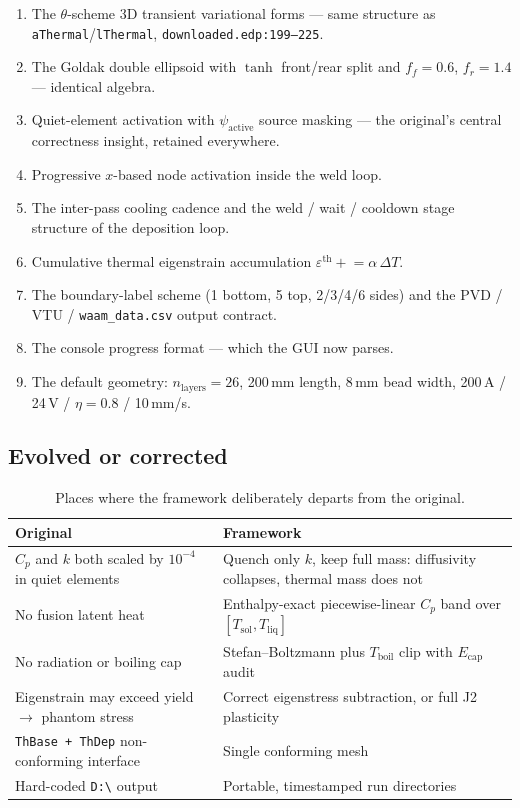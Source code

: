 \documentclass[10pt,a4paper]{article}
\newcommand{\code}[1]{\texttt{#1}}
\newcommand{\file}[1]{\texttt{\small #1}}
\begin{document}
\begin{enumerate}[leftmargin=1.8em,itemsep=0.2em]
    \item The $\theta$-scheme 3D transient variational forms --- same structure
    as \code{aThermal}/\code{lThermal}, \file{downloaded.edp:199--225}.
    \item The Goldak double ellipsoid with $\tanh$ front/rear split and
    $f_f = 0.6$, $f_r = 1.4$ --- identical algebra.
    \item Quiet-element activation with $\psi_{\text{active}}$ source masking
    --- the original's central correctness insight, retained everywhere.
    \item Progressive $x$-based node activation inside the weld loop.
    \item The inter-pass cooling cadence and the weld / wait / cooldown stage
    structure of the deposition loop.
    \item Cumulative thermal eigenstrain accumulation
    $\varepsilon^{\text{th}} \mathrel{+}= \alpha\,\Delta T$.
    \item The boundary-label scheme (1 bottom, 5 top, 2/3/4/6 sides) and the
    PVD / VTU / \code{waam\_data.csv} output contract.
    \item The console progress format --- which the GUI now parses.
    \item The default geometry: $n_{\text{layers}} = 26$, 200\,mm length,
    8\,mm bead width, 200\,A / 24\,V / $\eta = 0.8$ / 10\,mm/s.
\end{enumerate}

\subsection{Evolved or corrected}

\begin{table}[h!]
\centering
\caption{Places where the framework deliberately departs from the original.}
\label{tab:fixes}
\small
\begin{tabularx}{\linewidth}{@{}X X@{}}
\toprule
\textbf{Original} & \textbf{Framework} \\
\midrule
$C_p$ and $k$ both scaled by $10^{-4}$ in quiet elements & Quench only $k$,
keep full mass: diffusivity collapses, thermal mass does not \\
\addlinespace
No fusion latent heat & Enthalpy-exact piecewise-linear $C_p$ band over
$[T_{\text{sol}}, T_{\text{liq}}]$ \\
\addlinespace
No radiation or boiling cap & Stefan--Boltzmann plus $T_{\text{boil}}$ clip
with $E_{\text{cap}}$ audit \\
\addlinespace
Eigenstrain may exceed yield $\rightarrow$ phantom stress & Correct
eigenstress subtraction, or full J2 plasticity \\
\addlinespace
\code{ThBase + ThDep} non-conforming interface & Single conforming mesh \\
\addlinespace
Hard-coded \code{D:\textbackslash} output & Portable, timestamped run
directories \\
\bottomrule
\end{tabularx}
\end{table}
\end{document}
